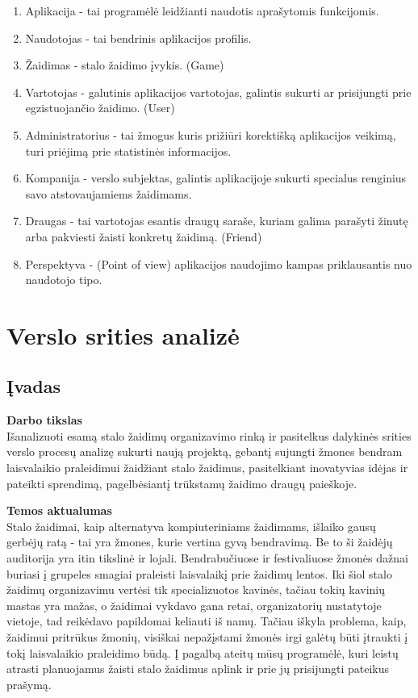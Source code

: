 \documentclass{VUMIFPSkursinis}
\begin{document}
\begin{enumerate}
\item Aplikacija - tai programėlė leidžianti naudotis aprašytomis funkcijomis.
\item Naudotojas - tai bendrinis aplikacijos profilis.
\item Žaidimas - stalo žaidimo įvykis. (Game)
\item Vartotojas - galutinis aplikacijos vartotojas, galintis sukurti ar prisijungti prie egzistuojančio žaidimo. (User)
\item Administratorius - tai žmogus kuris prižiūri korektišką aplikacijos veikimą, turi priėjimą prie statistinės informacijos.
\item Kompanija - verslo subjektas, galintis aplikacijoje sukurti specialus renginius savo atstovaujamiems žaidimams.
\item Draugas - tai vartotojas esantis draugų saraše, kuriam galima parašyti žinutę arba pakviesti žaisti konkretų žaidimą. (Friend)
\item Perspektyva - (Point of view) aplikacijos naudojimo kampas priklausantis nuo naudotojo tipo.

\end{enumerate} 

\section{Verslo srities analizė}

\subsection{Įvadas}
\textbf{Darbo tikslas}\\
Išanalizuoti esamą stalo žaidimų organizavimo rinką ir pasitelkus dalykinės srities verslo procesų analizę sukurti naują projektą, 
gebantį sujungti žmones bendram laisvalaikio praleidimui žaidžiant stalo žaidimus, pasitelkiant 
inovatyvias idėjas ir pateikti sprendimą, pagelbėsiantį trūkstamų žaidimo draugų paieškoje.

\textbf{Temos aktualumas}\\
Stalo žaidimai, kaip alternatyva kompiuteriniams žaidimams, išlaiko gausų gerbėjų ratą - tai 
yra žmones, kurie vertina gyvą bendravimą. Be to ši žaidėjų auditorija yra itin tikslinė ir 
lojali. Bendrabučiuose ir festivaliuose žmonės dažnai buriasi į grupeles smagiai praleisti 
laisvalaikį prie žaidimų lentos. Iki šiol stalo žaidimų organizavimu vertėsi tik specializuotos 
kavinės, tačiau tokių kavinių mastas yra mažas, o žaidimai vykdavo gana retai, organizatorių 
nustatytoje vietoje, tad reikėdavo papildomai keliauti iš namų. Tačiau iškyla problema, kaip, 
žaidimui pritrūkus žmonių, visiškai nepažįstami žmonės irgi galėtų būti įtraukti į tokį laisvalaikio 
praleidimo būdą. Į pagalbą ateitų mūsų programėlė, kuri leistų atrasti planuojamus žaisti stalo 
žaidimus aplink ir prie jų prisijungti pateikus prašymą.
\end{document}
